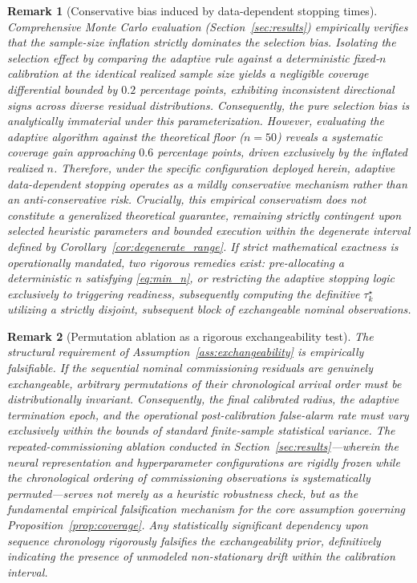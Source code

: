 \documentclass[a4paper]{cas-sc}
\newtheorem{remark}{Remark}
\begin{document}
\begin{remark}[Conservative bias induced by data-dependent stopping times]
Comprehensive Monte Carlo evaluation (Section~\ref{sec:results}) empirically verifies that the sample-size inflation strictly dominates the selection bias. Isolating the selection effect by comparing the adaptive rule against a deterministic fixed-\(n\) calibration at the \emph{identical} realized sample size yields a negligible coverage differential bounded by \(0.2\) percentage points, exhibiting inconsistent directional signs across diverse residual distributions. Consequently, the pure selection bias is analytically immaterial under this parameterization. However, evaluating the adaptive algorithm against the theoretical floor (\(n=50\)) reveals a systematic coverage \emph{gain} approaching \(0.6\) percentage points, driven exclusively by the inflated realized \(n\). Therefore, under the specific configuration deployed herein, adaptive data-dependent stopping operates as a mildly conservative mechanism rather than an anti-conservative risk. Crucially, this empirical conservatism does not constitute a generalized theoretical guarantee, remaining strictly contingent upon selected heuristic parameters and bounded execution within the degenerate interval defined by Corollary~\ref{cor:degenerate_range}. If strict mathematical exactness is operationally mandated, two rigorous remedies exist: pre-allocating a deterministic \(n\) satisfying \eqref{eq:min_n}, or restricting the adaptive stopping logic exclusively to triggering readiness, subsequently computing the definitive \(\tau_k^\star\) utilizing a strictly disjoint, subsequent block of exchangeable nominal observations.
\end{remark}

\begin{remark}[Permutation ablation as a rigorous exchangeability test]
\label{rem:exchangeability_test}
The structural requirement of Assumption~\ref{ass:exchangeability} is empirically falsifiable. If the sequential nominal commissioning residuals are genuinely exchangeable, arbitrary permutations of their chronological arrival order must be distributionally invariant. Consequently, the final calibrated radius, the adaptive termination epoch, and the operational post-calibration false-alarm rate must vary exclusively within the bounds of standard finite-sample statistical variance. The repeated-commissioning ablation conducted in Section~\ref{sec:results}—wherein the neural representation and hyperparameter configurations are rigidly frozen while the chronological ordering of commissioning observations is systematically permuted—serves not merely as a heuristic robustness check, but as the fundamental empirical falsification mechanism for the core assumption governing Proposition~\ref{prop:coverage}. Any statistically significant dependency upon sequence chronology rigorously falsifies the exchangeability prior, definitively indicating the presence of unmodeled non-stationary drift within the calibration interval.
\end{remark}
\end{document}
